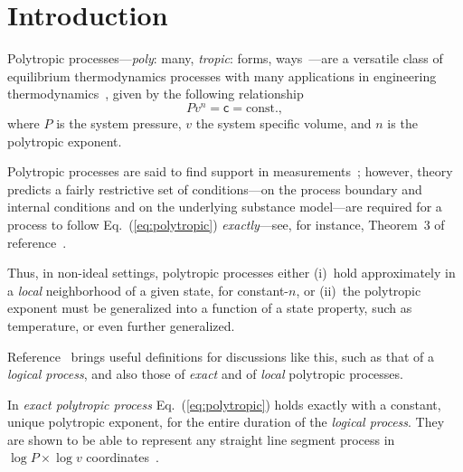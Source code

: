\section{Introduction}

    Polytropic        processes---\emph{poly}:        many,        \emph{tropic}:         forms,
    ways~\cite{2020-NaaktgeborenC-engrXiv}---are a versatile class of equilibrium thermodynamics
    processes          with          many          applications          in          engineering
    thermodynamics~\cite{2002-MoranMJ+ShapiroHN-LTC,                 2013-CengelYA+BolesMA-AMGH,
    2015-KroosKA+PotterMC-Cengage,  1986-JonesJB+HawkinsGA-Wiley},  given   by   the   following
    relationship
    \begin{equation}
        Pv^n = \mathsf{c} = \mbox{const.},
        \label{eq:polytropic}
    \end{equation}
    \noindent where $P$ is the system pressure, $v$ the system specific volume, and $n$  is  the
    polytropic exponent.

    Polytropic       processes       are       said       to       find        support        in
    measurements~\cite{2013-CengelYA+BolesMA-AMGH,                   2002-MoranMJ+ShapiroHN-LTC,
    1985-WylenG-Wiley};         however,          theory~\cite{2012-ChristiansJ-IntJMechEngEduc,
    2020-NaaktgeborenC-engrXiv} predicts a fairly restrictive set of conditions---on the process
    boundary and internal conditions and on the underlying substance model---are required for  a
    process to follow Eq.~(\ref{eq:polytropic}) \emph{exactly}---see, for instance, Theorem~3 of
    reference~\cite{2020-NaaktgeborenC-engrXiv}.

    Thus, in non-ideal  settings,  polytropic  processes  either  (i)~hold  approximately  in  a
    \emph{local} neighborhood of  a  given  state,  for  constant-$n$,  or  (ii)~the  polytropic
    exponent must be generalized into a function of a state property, such  as  temperature,  or
    even further generalized.

    Reference~\cite{2020-NaaktgeborenC-engrXiv} brings useful definitions for  discussions  like
    this, such as that of a \emph{logical process},  and  also  those  of  \emph{exact}  and  of
    \emph{local} polytropic processes.

    In \emph{exact polytropic process} Eq.~(\ref{eq:polytropic}) holds exactly with a  constant,
    unique polytropic exponent, for the entire duration of the \emph{logical process}. They  are
    shown to be able to represent any straight line segment process in $\log P  \times  \log  v$
    coordinates~\cite{2020-NaaktgeborenC-engrXiv}.

